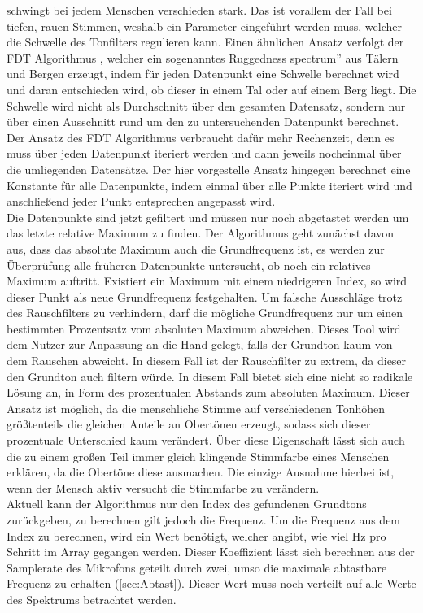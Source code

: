schwingt bei jedem Menschen verschieden stark. Das ist vorallem der Fall bei tiefen, rauen Stimmen, weshalb ein Parameter 
eingeführt werden muss, welcher die Schwelle des Tonfilters regulieren kann. Einen ähnlichen Ansatz verfolgt der FDT Algorithmus \cite{yazama2005simple}, welcher ein sogenanntes \glqq Ruggedness spectrum'' aus Tälern und Bergen erzeugt, indem für jeden Datenpunkt eine Schwelle berechnet wird und daran entschieden wird, ob dieser in einem Tal oder auf einem Berg liegt. Die Schwelle wird nicht als Durchschnitt über den gesamten Datensatz, sondern nur über einen Ausschnitt rund um den zu untersuchenden Datenpunkt berechnet. Der Ansatz des FDT Algorithmus verbraucht dafür mehr Rechenzeit, denn es muss über jeden Datenpunkt iteriert werden und dann jeweils nocheinmal über die umliegenden Datensätze. Der hier vorgestelle Ansatz hingegen berechnet eine Konstante für alle Datenpunkte, indem einmal über alle Punkte iteriert wird und anschließend jeder Punkt entsprechen angepasst wird. \\
Die Datenpunkte sind jetzt gefiltert und müssen nur noch abgetastet werden um das letzte relative Maximum zu finden. Der Algorithmus geht zunächst davon aus, dass das absolute Maximum auch die Grundfrequenz ist, es werden zur Überprüfung alle früheren Datenpunkte untersucht, ob noch ein relatives Maximum auftritt. Existiert ein Maximum mit einem niedrigeren Index, so wird dieser Punkt als neue Grundfrequenz festgehalten. Um falsche Ausschläge trotz des Rauschfilters zu verhindern, darf die mögliche Grundfrequenz nur um einen bestimmten Prozentsatz vom absoluten Maximum abweichen. Dieses Tool wird dem Nutzer zur Anpassung an die Hand gelegt, falls der Grundton kaum von dem Rauschen abweicht. In diesem Fall ist der Rauschfilter zu extrem, da dieser den Grundton auch filtern würde. In diesem Fall bietet sich eine nicht so radikale Lösung an, in Form des prozentualen Abstands zum absoluten Maximum. Dieser Ansatz ist möglich, da die menschliche Stimme auf verschiedenen Tonhöhen größtenteils die gleichen Anteile an Obertönen erzeugt, sodass sich dieser prozentuale Unterschied kaum verändert. Über diese Eigenschaft lässt sich auch die zu einem großen Teil immer gleich klingende Stimmfarbe eines Menschen erklären, da die Obertöne diese ausmachen. Die einzige Ausnahme hierbei ist, wenn der Mensch aktiv versucht die Stimmfarbe zu verändern. \\
Aktuell kann der Algorithmus nur den Index des gefundenen Grundtons zurückgeben, zu berechnen gilt jedoch die Frequenz. Um die Frequenz aus dem Index zu berechnen, wird ein Wert benötigt, welcher angibt, wie viel Hz pro Schritt im Array gegangen werden. Dieser Koeffizient lässt sich berechnen aus der Samplerate des Mikrofons geteilt durch zwei, umso die maximale abtastbare Frequenz zu erhalten (\ref{sec:Abtast}). Dieser Wert muss noch verteilt auf alle Werte des Spektrums betrachtet werden.
